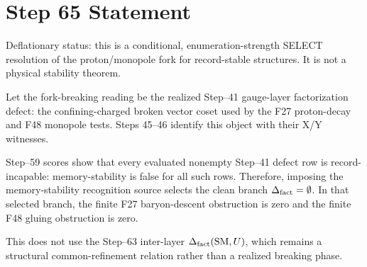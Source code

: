 \documentclass[11pt]{article}
\begin{document}
\section*{Step 65 Statement}
Deflationary status: this is a conditional, enumeration-strength SELECT resolution of the proton/monopole fork for record-stable structures. It is not a physical stability theorem.

Let the fork-breaking reading be the realized Step--41 gauge-layer factorization defect: the confining-charged broken vector coset used by the F27 proton-decay and F48 monopole tests. Steps 45--46 identify this object with their X/Y witnesses.

Step--59 scores show that every evaluated nonempty Step--41 defect row is record-incapable: memory-stability is false for all such rows. Therefore, imposing the memory-stability recognition source selects the clean branch \(\Delta_{\rm fact}=\emptyset\). In that selected branch, the finite F27 baryon-descent obstruction is zero and the finite F48 gluing obstruction is zero.

This does not use the Step--63 inter-layer \(\Delta_{\rm fact}(\mathrm{SM},U)\), which remains a structural common-refinement relation rather than a realized breaking phase.
\end{document}
